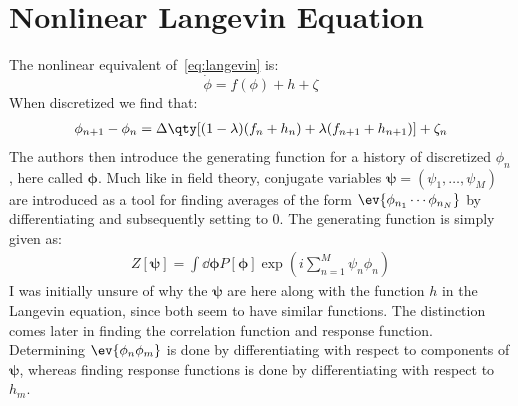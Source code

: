 \documentclass[12pt]{article}
\def\bpsi{\bm{\psi}}
\begin{document}
\section{Nonlinear Langevin Equation}
The nonlinear equivalent of~\eqref{eq:langevin} is:
\begin{equation}
  \label{eq:nlangevin}
  \dot{\phi}=f(\phi)+h+\zeta
\end{equation}
When discretized we find that:
\begin{align*}
  \phi_{n+1}-\phi_n=\Delta\qty[(1-\lambda)(f_n+h_n)+\lambda(f_{n+1}+h_{n+1})]
  +\zeta_n
\end{align*}
The authors then introduce the generating function for a history of discretized $\phi_n$, here called $\bm{\phi}$. Much like in field theory, conjugate variables $\bm{\psi}=(\psi_1,\ldots,\psi_M)$ are introduced as a tool for finding averages of the form $\ev{\phi_{n_1}\cdots\phi_{n_N}}$ by differentiating and subsequently setting to $0$. The generating function is simply given as:
\begin{align*}
  Z[\bm{\psi}]=\int\dd{\bm{\phi}}P[\bm{\phi}]\exp(i\sum_{n=1}^M\psi_n\phi_n)
\end{align*}
I was initially unsure of why the $\bm{\psi}$ are here along with the function $h$ in the Langevin equation, since both seem to have similar functions. The distinction comes later in finding the correlation function and response function. Determining $\ev{\phi_n\phi_m}$ is done by differentiating with respect to components of $\bpsi$, whereas finding response functions is done by differentiating with respect to $h_m$.
\end{document}
